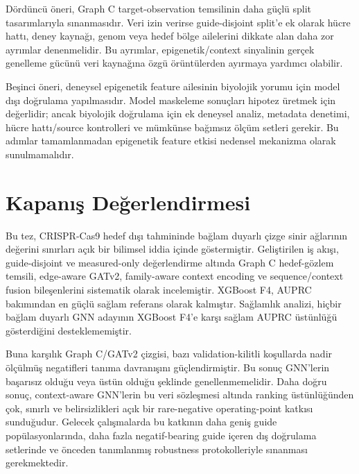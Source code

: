 Dördüncü öneri, Graph C target-observation temsilinin daha güçlü split tasarımlarıyla sınanmasıdır. Veri izin verirse guide-disjoint split'e ek olarak hücre hattı, deney kaynağı, genom veya hedef bölge ailelerini dikkate alan daha zor ayrımlar denenmelidir. Bu ayrımlar, epigenetik/context sinyalinin gerçek genelleme gücünü veri kaynağına özgü örüntülerden ayırmaya yardımcı olabilir.

Beşinci öneri, deneysel epigenetik feature ailesinin biyolojik yorumu için model dışı doğrulama yapılmasıdır. Model maskeleme sonuçları hipotez üretmek için değerlidir; ancak biyolojik doğrulama için ek deneysel analiz, metadata denetimi, hücre hattı/source kontrolleri ve mümkünse bağımsız ölçüm setleri gerekir. Bu adımlar tamamlanmadan epigenetik feature etkisi nedensel mekanizma olarak sunulmamalıdır.

\section{Kapanış Değerlendirmesi}

Bu tez, CRISPR-Cas9 hedef dışı tahmininde bağlam duyarlı çizge sinir ağlarının değerini sınırları açık bir bilimsel iddia içinde göstermiştir. Geliştirilen iş akışı, guide-disjoint ve measured-only değerlendirme altında Graph C hedef-gözlem temsili, edge-aware GATv2, family-aware context encoding ve sequence/context fusion bileşenlerini sistematik olarak incelemiştir. XGBoost F4, AUPRC bakımından en güçlü sağlam referans olarak kalmıştır. Sağlamlık analizi, hiçbir bağlam duyarlı GNN adayının XGBoost F4'e karşı sağlam AUPRC üstünlüğü gösterdiğini desteklememiştir.

Buna karşılık Graph C/GATv2 çizgisi, bazı validation-kilitli koşullarda nadir ölçülmüş negatifleri tanıma davranışını güçlendirmiştir. Bu sonuç GNN'lerin başarısız olduğu veya üstün olduğu şeklinde genellenmemelidir. Daha doğru sonuç, context-aware GNN'lerin bu veri sözleşmesi altında ranking üstünlüğünden çok, sınırlı ve belirsizlikleri açık bir rare-negative operating-point katkısı sunduğudur. Gelecek çalışmalarda bu katkının daha geniş guide popülasyonlarında, daha fazla negatif-bearing guide içeren dış doğrulama setlerinde ve önceden tanımlanmış robustness protokolleriyle sınanması gerekmektedir.
